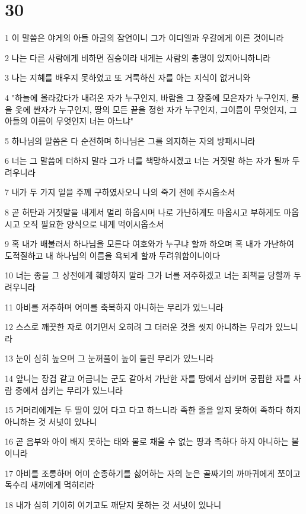 \chapter{30}

\par 1 이 말씀은 야게의 아들 아굴의 잠언이니 그가 이디엘과 우갈에게 이른 것이니라
\par 2 나는 다른 사람에게 비하면 짐승이라 내게는 사람의 총명이 있지아니하니라
\par 3 나는 지혜를 배우지 못하였고 또 거룩하신 자를 아는 지식이 없거니와
\par 4 "하늘에 올라갔다가 내려온 자가 누구인지, 바람을 그 장중에 모은자가 누구인지, 물을 옷에 싼자가 누구인지, 땅의 모든 끝을 정한 자가 누구인지, 그이름이 무엇인지, 그 아들의 이름이 무엇인지 너는 아느냐"
\par 5 하나님의 말씀은 다 순전하며 하나님은 그를 의지하는 자의 방패시니라
\par 6 너는 그 말씀에 더하지 말라 그가 너를 책망하시겠고 너는 거짓말 하는 자가 될까 두려우니라
\par 7 내가 두 가지 일을 주께 구하였사오니 나의 죽기 전에 주시옵소서
\par 8 곧 허탄과 거짓말을 내게서 멀리 하옵시며 나로 가난하게도 마옵시고 부하게도 마옵시고 오직 필요한 양식으로 내게 먹이시옵소서
\par 9 혹 내가 배불러서 하나님을 모른다 여호와가 누구냐 할까 하오며 혹 내가 가난하여 도적질하고 내 하나님의 이름을 욕되게 할까 두려워함이니이다
\par 10 너는 종을 그 상전에게 훼방하지 말라 그가 너를 저주하겠고 너는 죄책을 당할까 두려우니라
\par 11 아비를 저주하며 어미를 축복하지 아니하는 무리가 있느니라
\par 12 스스로 깨끗한 자로 여기면서 오히려 그 더러운 것을 씻지 아니하는 무리가 있느니라
\par 13 눈이 심히 높으며 그 눈꺼풀이 높이 들린 무리가 있느니라
\par 14 앞니는 장검 같고 어금니는 군도 같아서 가난한 자를 땅에서 삼키며 궁핍한 자를 사람 중에서 삼키는 무리가 있느니라
\par 15 거머리에게는 두 딸이 있어 다고 다고 하느니라 족한 줄을 알지 못하여 족하다 하지 아니하는 것 서넛이 있나니
\par 16 곧 음부와 아이 배지 못하는 태와 물로 채울 수 없는 땅과 족하다 하지 아니하는 불이니라
\par 17 아비를 조롱하며 어미 순종하기를 싫어하는 자의 눈은 골짜기의 까마귀에게 쪼이고 독수리 새끼에게 먹히리라
\par 18 내가 심히 기이히 여기고도 깨닫지 못하는 것 서넛이 있나니
